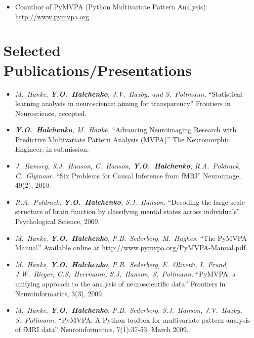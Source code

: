\documentclass[12pt,overlapped,line]{res}
\newcommand{\mtitle}[1]{``#1''}
\newcommand{\mauthors}[1]{ \textit{#1.}}
\newcommand{\mwhere}[1]{#1.}
\begin{document}
\begin{resume}
\begin{description}
\begin{itemize}
      \item Coauthor of PyMVPA (Python Multivariate Pattern Analysis): \url{http://www.pymvpa.org}

    \end{itemize}
  \end{description}

 \section{Selected Publications/Presentations}

 \begin{itemize}

 \item
   \mauthors{M.~Hanke, \textbf{Y.O.~Halchenko}, J.V.~Haxby, and S.~Pollmann}
   \mtitle{Statistical learning analysis in neuroscience: aiming for
     transparency}
   \mwhere{Frontiers in Neuroscience, accepted}

 \item
   \mauthors{\textbf{Y.O.~Halchenko}, M.~Hanke}
    \mtitle{Advancing Neuroimaging Research with Predictive Multivariate
Pattern Analysis (MVPA)}
    \mwhere{The Neuromorphic Engineer, in submission}

 \item
   \mauthors{J.~Ramsey, S.J.~Hanson, C.~Hanson, \textbf{Y.O.~Halchenko},
     R.A.~Poldrack, C.~Glymour}
   \mtitle{Six Problems for Causal Inference from fMRI}
   \mwhere{Neuroimage, 49(2), 2010}

 \item
   \mauthors{R.A.~Poldrack, \textbf{Y.O.~Halchenko}, S.J.~Hanson}
   \mtitle{Decoding the large-scale structure of brain function by
     classifying mental states across individuals}
   \mwhere{Psychological Science, 2009}

  \item
    \mauthors{M.~Hanke, \textbf{Y.O.~Halchenko}, P.B.~Sederberg, M.~Hughes}
    \mtitle{The PyMVPA Manual}
    \mwhere{\newline Available online at \url{http://www.pymvpa.org/PyMVPA-Manual.pdf}}

 \item
   \mauthors{ M.~Hanke, \textbf{Y.O.~Halchenko}, P.B.~Sederberg, E.~Olivetti, I.~Frund, J.W.~Rieger, C.S.~Herrmann, S.J.~Hanson, S.~Pollmann}
    \mtitle{PyMVPA: a unifying approach to the analysis of neuroscientific data}
    \mwhere{Frontiers in Neuroinformatics, 3(3), 2009}

  \item
    \mauthors{M.~Hanke, \textbf{Y.O.~Halchenko}, P.B.~Sederberg, S.J.~Hanson, J.V.~Haxby, S.~Pollmann}
    \mtitle{PyMVPA: A Python toolbox for multivariate pattern analysis of fMRI data}
    \mwhere{Neuroinformatics, 7(1):37-53, March 2009}


\end{itemize}
\end{resume}
\end{document}
